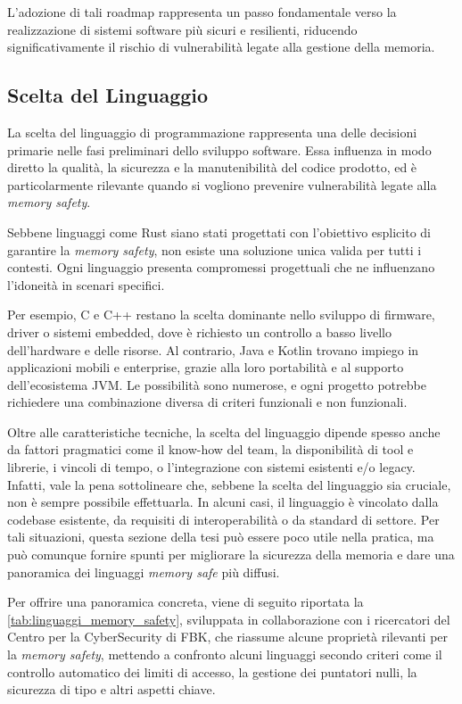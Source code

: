 L'adozione di tali roadmap rappresenta un passo fondamentale verso la realizzazione
di sistemi software più sicuri e resilienti, riducendo significativamente il
rischio di vulnerabilità legate alla gestione della memoria.

\subsection{Scelta del Linguaggio}
\label{sec:linguaggio}

La scelta del linguaggio di programmazione rappresenta una delle decisioni primarie
nelle fasi preliminari dello sviluppo software. Essa influenza in modo diretto
la qualità, la sicurezza e la manutenibilità del codice prodotto, ed è
particolarmente rilevante quando si vogliono prevenire vulnerabilità legate alla
\textit{memory safety}.

Sebbene linguaggi come Rust siano stati progettati con l'obiettivo esplicito di garantire
la \textit{memory safety}, non esiste una soluzione unica valida per tutti i contesti.
Ogni linguaggio presenta compromessi progettuali che ne influenzano l'idoneità
in scenari specifici.

Per esempio, C e C++ restano la scelta dominante nello sviluppo di firmware,
driver o sistemi embedded, dove è richiesto un controllo a basso livello dell'hardware
e delle risorse. Al contrario, Java e Kotlin trovano impiego in applicazioni mobili
e enterprise, grazie alla loro portabilità e al supporto dell'ecosistema JVM. Le
possibilità sono numerose, e ogni progetto potrebbe richiedere una combinazione
diversa di criteri funzionali e non funzionali.

Oltre alle caratteristiche tecniche, la scelta del linguaggio dipende spesso anche
da fattori pragmatici come il know-how del team, la disponibilità di tool e
librerie, i vincoli di tempo, o l'integrazione con sistemi esistenti e/o legacy.
Infatti, vale la pena sottolineare che, sebbene la scelta del linguaggio sia cruciale,
non è sempre possibile effettuarla. In alcuni casi, il linguaggio è vincolato
dalla codebase esistente, da requisiti di interoperabilità o da standard di settore.
Per tali situazioni, questa sezione della tesi può essere poco utile nella pratica,
ma può comunque fornire spunti per migliorare la sicurezza della memoria e dare
una panoramica dei linguaggi \textit{memory safe} più diffusi.

Per offrire una panoramica concreta, viene di seguito riportata la
\autoref{tab:linguaggi_memory_safety}, sviluppata in collaborazione con i ricercatori
del Centro per la CyberSecurity di FBK, che riassume alcune proprietà rilevanti
per la \textit{memory safety}, mettendo a confronto alcuni linguaggi secondo
criteri come il controllo automatico dei limiti di accesso, la gestione dei puntatori
nulli, la sicurezza di tipo e altri aspetti chiave.

